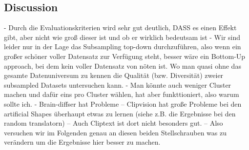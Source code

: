 



\subsection{Discussion}

- Durch die Evaluationskriterien wird sehr gut deutlich, DASS es einen Effekt gibt, aber nicht wie groß dieser ist und ob er wirklich bedeutsam ist
- Wir sind leider nur in der Lage das Subsampling top-down durchzuführen, also wenn ein großer schöner voller Datensatz zur Verfügung steht, besser wäre ein Bottom-Up approach, bei dem kein voller Datensatz von nöten ist. Wo man quasi ohne das gesamte Datenuniversum zu kennen die Qualität (bzw. Diversität) zweier subsampled Datasets untersuchen kann. 
- Man könnte auch weniger Cluster machen und dafür eins pro Cluster wählen, hat aber funkttioniert, also warum sollte ich.
- Brain-diffser hat Probleme
  -- Clipvision hat große Probleme bei den artificial Shapes überhaupt etwas zu lernen (siehe z.B. die Ergebnisse bei den random translatorn)
  -- Auch Cliptext ist dort nicht besonders gut. 
  -- Also versuchen wir im Folgenden genau an diesen beiden Stellschrauben was zu verändern um die Ergebnisse hier besser zu machen. 
